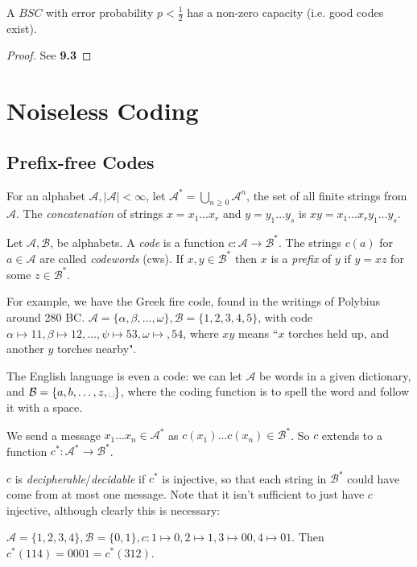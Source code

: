 \documentclass[10pt,a4paper]{article}
\begin{document}
\begin{theorem}
A $BSC$ with error probability $p < \frac12$ has a non-zero capacity (i.e. good codes exist).
\end{theorem}
\begin{proof}
See \textbf{9.3}
\end{proof}

\section{Noiseless Coding}
\subsection{Prefix-free Codes}
For an alphabet $\mathcal{A}, |\mathcal{A}|<\infty$, let $\mathcal{A}^{\ast} = \bigcup_{n\geq 0} \mathcal{A}^n$, the set of all finite strings from $\mathcal{A}$. The \emph{concatenation} of strings $x = x_1\ldots x_r$ and $y = y_1\ldots y_s$ is $xy = x_1\ldots x_ry_1\ldots y_s$.

Let $\mathcal{A}, \mathcal{B}$, be alphabets. A \emph{code} is a function $c:\mathcal{A} \to \mathcal{B}^{\ast}$. The strings $c(a)$ for $a \in \mathcal{A}$ are called \emph{codewords} (cws). If $x, y \in \mathcal{B}^{\ast}$ then $x$ is a \emph{prefix} of $y$ if $y=xz$ for some $z \in \mathcal{B}^{\ast}$.

For example, we have the Greek fire code, found in the writings of Polybius around 280 BC. $\mathcal{A} = \{\alpha, \beta, \ldots, \omega\}, \mathcal{B} = \{1,2,3,4,5\}$, with code $\alpha \mapsto 11, \beta \mapsto 12, \ldots, \psi \mapsto 53, \omega \mapsto, 54$, where $xy$ means ``$x$ torches held up, and another $y$ torches nearby".

The English language is even a code: we can let $\mathcal{A}$ be words in a given dictionary, and $\mathcal{B} = \{a,b,\ldots,z,\text{\textvisiblespace}\}$, where the coding function is to spell the word and follow it with a space.

We send a message $x_1\ldots x_n \in \mathcal{A}^{\ast}$ as $c(x_1)\ldots c(x_n) \in \mathcal{B}^{\ast}$. So $c$ extends to a function $c^{\ast}:\mathcal{A}^{\ast} \to \mathcal{B}^{\ast}$.

$c$ is \emph{decipherable}/\emph{decidable} if $c^{\ast}$ is injective, so that each string in $\mathcal{B}^{\ast}$ could have come from at most one message. Note that it isn't sufficient to just have $c$ injective, although clearly this is necessary:

$\mathcal{A} = \{1,2,3,4\}, \mathcal{B} = \{0,1\}, c:1\mapsto 0, 2\mapsto 1, 3\mapsto 00, 4\mapsto 01$. Then $c^{\ast}(114) = 0001 = c^{\ast}(312)$.
\end{document}
